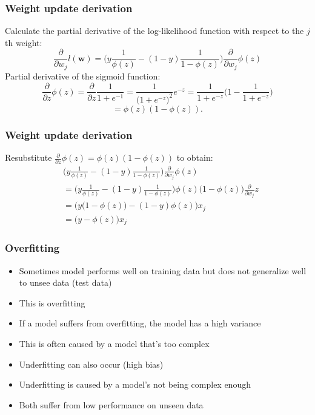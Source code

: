 \documentclass{beamer}
\begin{document}
\begin{frame}
  \frametitle{Weight update derivation}
  Calculate the partial derivative of the log-likelihood function with respect to the $j$th weight:
  \[
  \frac{\partial}{\partial w_j} l(\mathbf{w}) = \Bigg( y \frac{1}{\phi(z)}  - (1-y) \frac{1}{1-\phi(z)}   \Bigg)   \frac{\partial}{\partial w_j} \phi(z)
  \]
  Partial derivative of the sigmoid function:
  \[
  \frac{\partial}{\partial z} \phi(z) = \frac{\partial}{\partial z} \frac{1}{1 + e^{-1}} = \frac{1}{\big( 1 + e^{-z}\big)^2} e^{-z} = \frac{1}{1 + e^{-z}} \bigg( 1 - \frac{1}{1 + e^{-z}} \bigg)
  \]
  \[
  = \phi(z)(1-\phi(z)).
  \]
\end{frame}

\begin{frame}
  \frametitle{Weight update derivation}
  Resubstitute $\frac{\partial}{\partial z} \phi(z) = \phi(z)(1-\phi(z))$ to obtain:
  \begin{equation*}
  \begin{split}
    & \Bigg( y \frac{1}{\phi(z)} - (1-y) \frac{1}{1-\phi(z)} \Bigg) \frac{\partial}{\partial w_j} \phi(z) \\
    & = \Bigg( y \frac{1}{\phi(z)} - (1-y) \frac{1}{1-\phi(z)} \Bigg) \phi(z) \big(1 - \phi(z)\big) \frac{\partial}{\partial w_j} z \\
    & = \bigg(  y \big( 1 - \phi(z)   \big) - (1-y) \phi(z)  \bigg) x_j \\
    & = \big( y - \phi(z)  \big) x_j
  \end{split}
  \end{equation*}
\end{frame}

\begin{frame}
  \frametitle{Overfitting}
  \begin{itemize}
  \item Sometimes model performs well on training data but does not generalize well to unsee data (test data)
  \item This is overfitting
  \item If a model suffers from overfitting, the model has a high variance
  \item This is often caused by a model that's too complex
  \item Underfitting can also occur (high bias)
  \item Underfitting is caused by a model's not being complex enough
  \item Both suffer from low performance on unseen data
  \end{itemize}
\end{frame}
\end{document}
